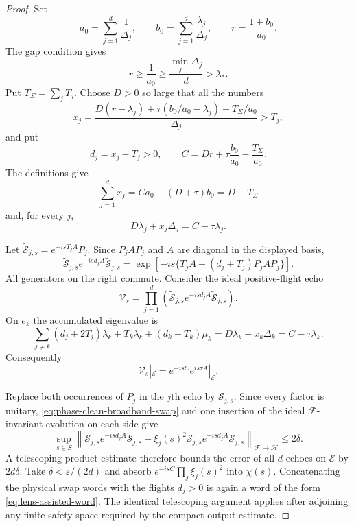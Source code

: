 \documentclass[11pt]{article}
\theoremstyle{remark}
\begin{document}
\begin{proof}
Set
\[
 a_0=\sum_{j=1}^d\frac1{\Delta_j},
 \qquad
 b_0=\sum_{j=1}^d\frac{\lambda_j}{\Delta_j},
 \qquad
 r=\frac{1+b_0}{a_0}.
\]
The gap condition gives
\[
 r\geq\frac1{a_0}
 \geq\frac{\min_j\Delta_j}{d}
 >\lambda_\ast.
\]
Put $T_\Sigma=\sum_jT_j$.  Choose $D>0$ so large that all the numbers
\begin{equation}
 x_j=
 \frac{
  D(r-\lambda_j)+
  \tau(b_0/a_0-\lambda_j)-T_\Sigma/a_0
  }{\Delta_j}
 >T_j,
 \label{eq:positive-echo-times}
\end{equation}
and put
\begin{equation}
 d_j=x_j-T_j>0,
 \qquad
 C=Dr+\tau\frac{b_0}{a_0}-\frac{T_\Sigma}{a_0}.
 \label{eq:echo-scalar-phase}
\end{equation}
The definitions give
\[
 \sum_{j=1}^dx_j
 =Ca_0-(D+\tau)b_0
 =D-T_\Sigma
\]
and, for every $j$,
\begin{equation}
 D\lambda_j+x_j\Delta_j=C-\tau\lambda_j.
 \label{eq:echo-eigenvalue-reversal}
\end{equation}

Let
$\widetilde{\mathcal S}_{j,s}=e^{-isT_jA}P_j$.  Since $P_jAP_j$ and $A$
are diagonal in the displayed basis,
\begin{equation}
 \widetilde{\mathcal S}_{j,s}e^{-isd_jA}
 \widetilde{\mathcal S}_{j,s}
 =
 \exp\!\left[
  -is\{T_jA+(d_j+T_j)P_jAP_j\}
 \right].
 \label{eq:drift-decorated-single-echo}
\end{equation}
All generators on the right commute.  Consider the ideal positive-flight echo
\[
 \mathcal V_s=
 \prod_{j=1}^d
 \left(
  \widetilde{\mathcal S}_{j,s}e^{-isd_jA}
  \widetilde{\mathcal S}_{j,s}
 \right).
\]
On $e_k$ the accumulated eigenvalue is
\[
 \sum_{j\neq k}(d_j+2T_j)\lambda_k
 +T_k\lambda_k+(d_k+T_k)\mu_k
 =D\lambda_k+x_k\Delta_k
 =C-\tau\lambda_k.
\]
Consequently
\begin{equation}
 \mathcal V_s|_{\mathcal E}
 =e^{-isC}e^{is\tau A}|_{\mathcal E}.
 \label{eq:ideal-swap-echo}
\end{equation}

Replace both occurrences of $P_j$ in the $j$th echo by
$\mathcal S_{j,s}$.  Since every factor is unitary,
\eqref{eq:phase-clean-broadband-swap} and one insertion of the ideal
$\mathcal F$-invariant evolution on each side give
\[
 \sup_{s\in S}
 \left\|
  \mathcal S_{j,s}e^{-isd_jA}\mathcal S_{j,s}
  -
  \xi_j(s)^2
  \widetilde{\mathcal S}_{j,s}e^{-isd_jA}
  \widetilde{\mathcal S}_{j,s}
 \right\|_{\mathcal F\to\mathcal H}
 \leq2\delta.
\]
A telescoping product estimate therefore bounds the error of all $d$ echoes
on $\mathcal E$ by $2d\delta$.  Take
$\delta<\varepsilon/(2d)$ and absorb
$e^{-isC}\prod_j\xi_j(s)^2$ into $\chi(s)$.  Concatenating the physical swap
words with the flights $d_j>0$ is again a word of the form
\eqref{eq:lens-assisted-word}.  The identical telescoping argument applies
after adjoining any finite safety space required by the compact-output
estimate.
\end{proof}
\end{document}

